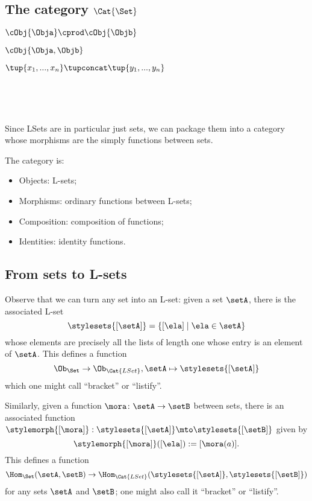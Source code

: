 \subsection{The category $\Cat{\Set}$}


\cCat{\Set}


$\cObj{\Obja} \cprod \cObj{\Objb}$

$\cObj{\Obja, \Objb}$


$\tup{x_1, ..., x_n} \tupconcat \tup{y_1, ..., y_n}$

\

\

Since LSets are in particular just sets, we can package them into a category whose morphisms are the simply functions between sets.

\begin{ctdefinition}
    The category  is:

    \begin{itemize}
        \item Objects: L-sets;
        \item Morphisms: ordinary functions between L-sets;
        \item Composition: composition of functions;
        \item Identities: identity functions.
    \end{itemize}
\end{ctdefinition}

\subsection{From sets to L-sets}

Observe that we can turn any set into an L-set: given a set $\setA$, there is the associated L-set 
\begin{equation}
\stylesets{[\setA]} = \{ [\ela] \mid \ela \in \setA \}
\end{equation}
whose elements are precisely all the lists of length one whose entry is an element of $\setA$. This defines a function
\begin{equation}
\Ob_{\Set} \to \Ob_{\Cat{LSet}}, \setA \mapsto \stylesets{[\setA]}
\end{equation}
which one might call ``bracket'' or ``listify''. 

Similarly, given a function $\mora \colon \setA \to \setB$ between sets, there is an associated function $\stylemorph{[ \mora ]}: \stylesets{[\setA]} \mto \stylesets{[\setB]}$ given by 
\begin{equation}
\stylemorph{[ \mora ]} ([ \ela ]) := [\mora(a)].
\end{equation}
This defines a function 
\begin{equation}
\Hom_{\Set}(\setA,\setB) \to \Hom_{\Cat{LSet}}(\stylesets{[\setA]},\stylesets{[\setB]})
\end{equation}
for any sets $\setA$ and $\setB$; one might also call it ``bracket'' or ``listify''.





